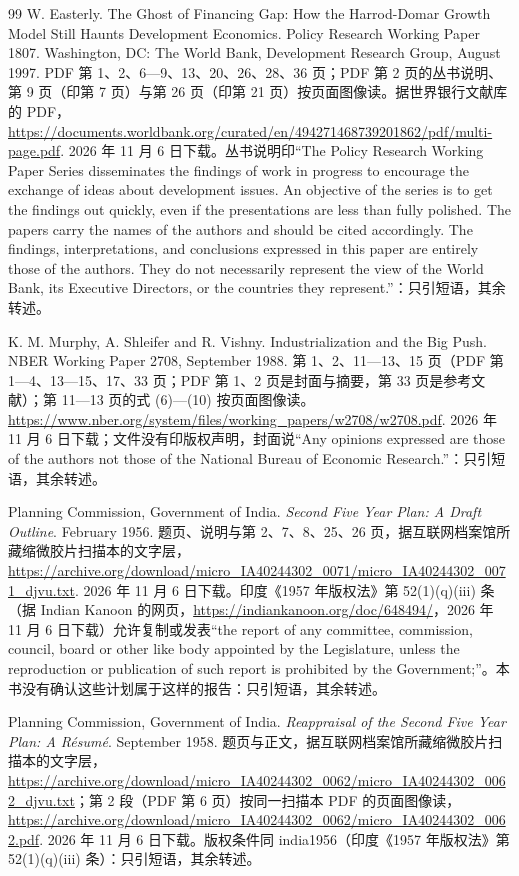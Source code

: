 \begin{thebibliography}{99}
 W. Easterly. The Ghost of Financing Gap: How the Harrod-Domar Growth Model Still Haunts Development Economics. Policy Research Working Paper 1807. Washington, DC: The World Bank, Development Research Group, August 1997. PDF 第 1、2、6—9、13、20、26、28、36 页；PDF 第 2 页的丛书说明、第 9 页（印第 7 页）与第 26 页（印第 21 页）按页面图像读。据世界银行文献库的 PDF，\url{https://documents.worldbank.org/curated/en/494271468739201862/pdf/multi-page.pdf}. 2026 年 11 月 6 日下载。丛书说明印“The Policy Research Working Paper Series disseminates the findings of work in progress to encourage the exchange of ideas about development issues. An objective of the series is to get the findings out quickly, even if the presentations are less than fully polished. The papers carry the names of the authors and should be cited accordingly. The findings, interpretations, and conclusions expressed in this paper are entirely those of the authors. They do not necessarily represent the view of the World Bank, its Executive Directors, or the countries they represent.”：只引短语，其余转述。

 K. M. Murphy, A. Shleifer and R. Vishny. Industrialization and the Big Push. NBER Working Paper 2708, September 1988. 第 1、2、11—13、15 页（PDF 第 1—4、13—15、17、33 页；PDF 第 1、2 页是封面与摘要，第 33 页是参考文献）；第 11—13 页的式 (6)—(10) 按页面图像读。\url{https://www.nber.org/system/files/working_papers/w2708/w2708.pdf}. 2026 年 11 月 6 日下载；文件没有印版权声明，封面说“Any opinions expressed are those of the authors not those of the National Bureau of Economic Research.”：只引短语，其余转述。

 Planning Commission, Government of India. \emph{Second Five Year Plan: A Draft Outline}. February 1956. 题页、说明与第 2、7、8、25、26 页，据互联网档案馆所藏缩微胶片扫描本的文字层，\url{https://archive.org/download/micro_IA40244302_0071/micro_IA40244302_0071_djvu.txt}. 2026 年 11 月 6 日下载。印度《1957 年版权法》第 52(1)(q)(iii) 条（据 Indian Kanoon 的网页，\url{https://indiankanoon.org/doc/648494/}，2026 年 11 月 6 日下载）允许复制或发表“the report of any committee, commission, council, board or other like body appointed by the Legislature, unless the reproduction or publication of such report is prohibited by the Government;”。本书没有确认这些计划属于这样的报告：只引短语，其余转述。

 Planning Commission, Government of India. \emph{Reappraisal of the Second Five Year Plan: A Résumé}. September 1958. 题页与正文，据互联网档案馆所藏缩微胶片扫描本的文字层，\url{https://archive.org/download/micro_IA40244302_0062/micro_IA40244302_0062_djvu.txt}；第 2 段（PDF 第 6 页）按同一扫描本 PDF 的页面图像读，\url{https://archive.org/download/micro_IA40244302_0062/micro_IA40244302_0062.pdf}. 2026 年 11 月 6 日下载。版权条件同 india1956（印度《1957 年版权法》第 52(1)(q)(iii) 条）：只引短语，其余转述。


\end{thebibliography}
